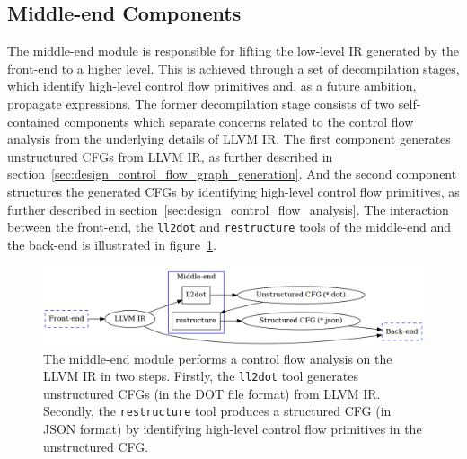


\subsection{Middle-end Components}
\label{sec:design_middle-end_components}

The middle-end module is responsible for lifting the low-level IR generated by the front-end to a higher level. This is achieved through a set of decompilation stages, which identify high-level control flow primitives and, as a future ambition, propagate expressions. The former decompilation stage consists of two self-contained components which separate concerns related to the control flow analysis from the underlying details of LLVM IR. The first component generates unstructured CFGs from LLVM IR, as further described in section~\ref{sec:design_control_flow_graph_generation}. And the second component structures the generated CFGs by identifying high-level control flow primitives, as further described in section~\ref{sec:design_control_flow_analysis}. The interaction between the front-end, the \texttt{ll2dot} and \texttt{restructure} tools of the middle-end and the back-end is illustrated in figure~\ref{fig:middle-end}.

\begin{figure}[htbp]
	\begin{center}
		\includegraphics[width=\textwidth]{inc/6_design/middle-end.png}
		\caption{The middle-end module performs a control flow analysis on the LLVM IR in two steps. Firstly, the \texttt{ll2dot} tool generates unstructured CFGs (in the DOT file format) from LLVM IR. Secondly, the \texttt{restructure} tool produces a structured CFG (in JSON format) by identifying high-level control flow primitives in the unstructured CFG.}
		\label{fig:middle-end}
	\end{center}
\end{figure}




